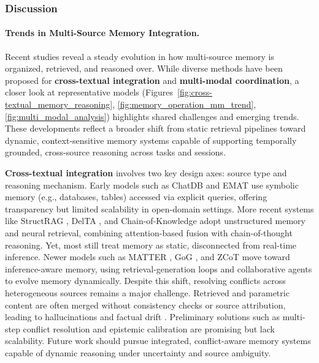 \documentclass[manuscript,screen]{acmart}
\begin{document}
\subsubsection{Discussion}

\paragraph{Trends in Multi-Source Memory Integration.}
Recent studies \citep{wang2025new, song2024moviechat} reveal a steady evolution in how multi-source memory is organized, retrieved, and reasoned over. While diverse methods have been proposed for \textbf{cross-textual integration} and \textbf{multi-modal coordination}, a closer look at representative models (Figures~\ref{fig:cross-textual_memory_reasoning}, \ref{fig:memory_operation_mm_trend}, \ref{fig:multi_modal_analysis}) highlights shared challenges and emerging trends. These developments reflect a broader shift from static retrieval pipelines toward dynamic, context-sensitive memory systems capable of supporting temporally grounded, cross-source reasoning across tasks and sessions.

\textbf{Cross-textual integration} involves two key design axes: source type and reasoning mechanism. Early models such as ChatDB \citep{hu2023chatdb} and EMAT \citep{wu-etal-2022-efficient} use symbolic memory (e.g., databases, tables) accessed via explicit queries, offering transparency but limited scalability in open-domain settings. More recent systems like StructRAG \citep{li2024structrag}, DelTA \citep{wang2025delta}, and Chain-of-Knowledge \citep{li2024chain} adopt unstructured memory and neural retrieval, combining attention-based fusion with chain-of-thought reasoning. Yet, most still treat memory as static, disconnected from real-time inference. Newer models such as MATTER \citep{DBLP:conf/acl/LeePF024}, GoG \citep{xu2024generate}, and ZCoT \citep{michelman2025enhancing} move toward inference-aware memory, using retrieval-generation loops and collaborative agents to evolve memory dynamically.  Despite this shift, resolving conflicts across heterogeneous sources remains a major challenge. Retrieved and parametric content are often merged without consistency checks or source attribution, leading to hallucinations and factual drift \citep{tan-etal-2024-blinded, zhou-etal-2023-context}. Preliminary solutions such as multi-step conflict resolution \citep{wang2023resolving} and epistemic calibration \citep{xu2024knowledge} are promising but lack scalability. Future work should pursue integrated, conflict-aware memory systems capable of dynamic reasoning under uncertainty and source ambiguity.
\end{document}
